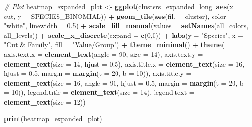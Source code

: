 \documentclass[
]{article}
\newenvironment{Shaded}{\begin{snugshade}}{\end{snugshade}}
\newcommand{\AttributeTok}[1]{\textcolor[rgb]{0.13,0.29,0.53}{#1}}
\newcommand{\CommentTok}[1]{\textcolor[rgb]{0.56,0.35,0.01}{\textit{#1}}}
\newcommand{\DecValTok}[1]{\textcolor[rgb]{0.00,0.00,0.81}{#1}}
\newcommand{\FloatTok}[1]{\textcolor[rgb]{0.00,0.00,0.81}{#1}}
\newcommand{\FunctionTok}[1]{\textcolor[rgb]{0.13,0.29,0.53}{\textbf{#1}}}
\newcommand{\NormalTok}[1]{#1}
\newcommand{\OtherTok}[1]{\textcolor[rgb]{0.56,0.35,0.01}{#1}}
\newcommand{\SpecialCharTok}[1]{\textcolor[rgb]{0.81,0.36,0.00}{\textbf{#1}}}
\newcommand{\StringTok}[1]{\textcolor[rgb]{0.31,0.60,0.02}{#1}}
\begin{document}
\begin{Shaded}
\begin{Highlighting}[]
\CommentTok{\# Plot}
\NormalTok{heatmap\_expanded\_plot }\OtherTok{\textless{}{-}} \FunctionTok{ggplot}\NormalTok{(clusters\_expanded\_long, }\FunctionTok{aes}\NormalTok{(}\AttributeTok{x =}\NormalTok{ cut, }\AttributeTok{y =}\NormalTok{ SPECIES\_BINOMIAL)) }\SpecialCharTok{+}
  \FunctionTok{geom\_tile}\NormalTok{(}\FunctionTok{aes}\NormalTok{(}\AttributeTok{fill =}\NormalTok{ cluster), }\AttributeTok{color =} \StringTok{"white"}\NormalTok{, }\AttributeTok{linewidth =} \FloatTok{0.5}\NormalTok{) }\SpecialCharTok{+}
  \FunctionTok{scale\_fill\_manual}\NormalTok{(}\AttributeTok{values =} \FunctionTok{setNames}\NormalTok{(all\_colors, all\_levels)) }\SpecialCharTok{+}
  \FunctionTok{scale\_x\_discrete}\NormalTok{(}\AttributeTok{expand =} \FunctionTok{c}\NormalTok{(}\DecValTok{0}\NormalTok{,}\DecValTok{0}\NormalTok{)) }\SpecialCharTok{+}
  \FunctionTok{labs}\NormalTok{(}\AttributeTok{y =} \StringTok{"Species"}\NormalTok{, }\AttributeTok{x =} \StringTok{"Cut \& Family"}\NormalTok{, }\AttributeTok{fill =} \StringTok{"Value/Group"}\NormalTok{) }\SpecialCharTok{+}
  \FunctionTok{theme\_minimal}\NormalTok{() }\SpecialCharTok{+}
  \FunctionTok{theme}\NormalTok{(}
    \AttributeTok{axis.text.x =} \FunctionTok{element\_text}\NormalTok{(}\AttributeTok{angle =} \DecValTok{90}\NormalTok{, }\AttributeTok{size =} \DecValTok{14}\NormalTok{),}
    \AttributeTok{axis.text.y =} \FunctionTok{element\_text}\NormalTok{(}\AttributeTok{size =} \DecValTok{14}\NormalTok{, }\AttributeTok{hjust =} \FloatTok{0.5}\NormalTok{),}
    \AttributeTok{axis.title.x =} \FunctionTok{element\_text}\NormalTok{(}\AttributeTok{size =} \DecValTok{16}\NormalTok{, }\AttributeTok{hjust =} \FloatTok{0.5}\NormalTok{, }\AttributeTok{margin =} \FunctionTok{margin}\NormalTok{(}\AttributeTok{t =} \DecValTok{20}\NormalTok{, }\AttributeTok{b =} \DecValTok{10}\NormalTok{)),}
    \AttributeTok{axis.title.y =} \FunctionTok{element\_text}\NormalTok{(}\AttributeTok{size =} \DecValTok{16}\NormalTok{, }\AttributeTok{angle =} \DecValTok{90}\NormalTok{, }\AttributeTok{hjust =} \FloatTok{0.5}\NormalTok{, }\AttributeTok{margin =} \FunctionTok{margin}\NormalTok{(}\AttributeTok{t =} \DecValTok{20}\NormalTok{, }\AttributeTok{b =} \DecValTok{10}\NormalTok{)),}
    \AttributeTok{legend.title =} \FunctionTok{element\_text}\NormalTok{(}\AttributeTok{size =} \DecValTok{14}\NormalTok{),}
    \AttributeTok{legend.text =} \FunctionTok{element\_text}\NormalTok{(}\AttributeTok{size =} \DecValTok{12}\NormalTok{))}
    
\FunctionTok{print}\NormalTok{(heatmap\_expanded\_plot)}
\end{Highlighting}
\end{Shaded}
\end{document}
